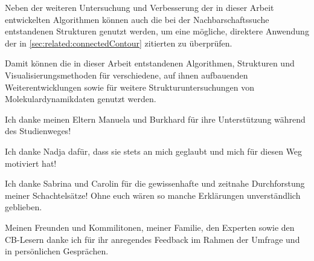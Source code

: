 Neben der weiteren Untersuchung und Verbesserung der in dieser Arbeit entwickelten Algorithmen können auch die bei der Nachbarschaftssuche entstandenen Strukturen genutzt werden, um eine mögliche, direktere Anwendung der in \autoref{sec:related:connectedContour} zitierten  zu überprüfen.

Damit können die in dieser Arbeit entstandenen Algorithmen, Strukturen und Visualisierungsmethoden für verschiedene, auf ihnen aufbauenden Weiterentwicklungen sowie für weitere Strukturuntersuchungen von Molekulardynamikdaten genutzt werden.




Ich danke meinen Eltern Manuela und Burkhard für ihre Unterstützung während des Studienweges!

Ich danke Nadja dafür, dass sie stets an mich geglaubt und mich für diesen Weg motiviert hat!

Ich danke Sabrina und Carolin für die gewissenhafte und zeitnahe Durchforstung meiner Schachtelsätze! Ohne euch wären so manche Erklärungen unverständlich geblieben.

Meinen Freunden und Kommilitonen, meiner Familie, den Experten sowie den CB-Lesern danke ich für ihr anregendes Feedback im Rahmen der Umfrage und in persönlichen Gesprächen.

